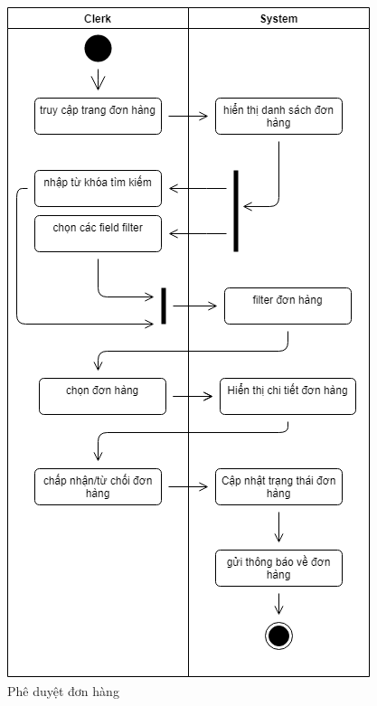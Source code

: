 \begin{figure}[!h]
    \begin{center}
        \includegraphics[scale=0.7]{Images/ActivityDiagram/processingOrder.png}
    \end{center}
    \hspace{0.3cm}
    \caption{Phê duyệt đơn hàng}
\end{figure}